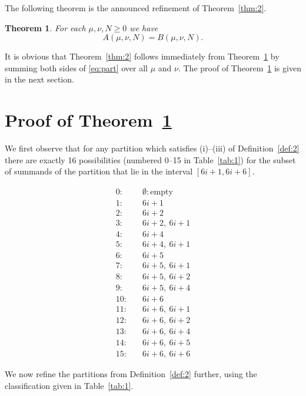 \documentclass[12pt,twoside]{amsart}
\newtheorem{Theorem}{Theorem}
\theoremstyle{remark}
\numberwithin{equation}{section}
\begin{document}
The following theorem is the announced refinement of Theorem~\ref{thm:2}.

\begin{Theorem}\label{thm:3}
For each $\mu,\nu,N \geq 0 $ we have
\begin{equation} \label{eq:part}
 A(\mu,\nu,N) = B(\mu,\nu,N).
\end{equation}
\end{Theorem}

It is obvious that Theorem~\ref{thm:2} follows immediately from
Theorem~\ref{thm:3} by summing both sides of \eqref{eq:part} over all
$\mu$ and $\nu$. The proof of Theorem~\ref{thm:3} is given in the next
section.

\section{Proof of Theorem~\ref{thm:3}} \label{sec:3}

We first observe that for any partition which satisfies
(i)--(iii) of Definition~\ref{def:2} there are exactly
16 possibilities (numbered 0--15 in Table~\ref{tab:1})
for the subset of summands of the partition that lie in the interval
$[6i+1, 6i+6]$.

\begin{table}[h]
$$
\begin{array}{rl}
0:\quad& \emptyset : \text{empty} \\
 1: \quad&  6i+1 \\
 2:\quad&  6i+2 \\
 3:\quad&  6i+2,\ 6i+1 \\
 4: \quad& 6i+4 \\
 5: \quad& 6i+4,\ 6i+1 \\
 6:\quad&  6i+5 \\
 7: \quad& 6i+5,\ 6i+1 \\
 8:\quad&  6i+5,\ 6i+2 \\
 9: \quad& 6i+5,\ 6i+4 \\
 10:\quad&  6i+6 \\
 11:\quad&  6i+6,\ 6i+1 \\
 12:\quad&  6i+6,\ 6i+2 \\
 13: \quad& 6i+6,\ 6i+4 \\
 14:\quad&  6i+6,\ 6i+5 \\
 15: \quad& 6i+6,\ 6i+6
\end{array}
$$
\caption{}
\label{tab:1}
\end{table}

We now refine the partitions from Definition~\ref{def:2} further,
using the classification given in Table~\ref{tab:1}.
\end{document}
